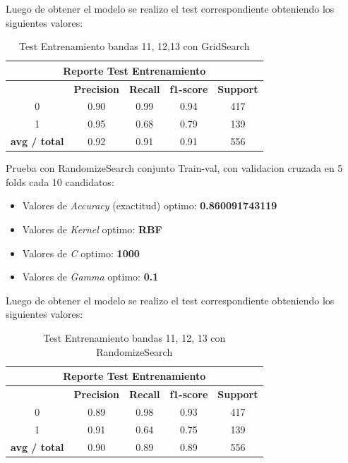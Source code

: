 Luego de obtener el modelo se realizo el test correspondiente obteniendo los siguientes valores:
\begin{table}[H]
\begin{center}
\begin{tabular}{|c|c|c|c|c|}
\hline \multicolumn{5}{|c|}{Reporte Test Entrenamiento} \\ \hline
\hline \textbf{} & \textbf{Precision} & \textbf{Recall} & \textbf{f1-score} & \textbf{Support}\\ \hline 
				 0   & 0.90 & 0.99 & 0.94  & 417	\\ \hline 
				 1   & 0.95 & 0.68 & 0.79  & 139 \\ \hline 
\textbf{avg / total} & 0.92 & 0.91 & 0.91  & 556 \\ \hline
\end{tabular}
\end{center} \caption{Test Entrenamiento bandas 11, 12,13 con GridSearch}\label{tab:gridsearchtest111213}
\end{table}


Prueba con RandomizeSearch conjunto Train-val, con validacion cruzada en 5 folds cada 10 candidatos:

\begin{itemize}
\item Valores de \textit{Accuracy} (exactitud) optimo: \textbf{0.860091743119}
\item Valores de \textit{Kernel} optimo: \textbf{RBF}
\item Valores de \textit{C} optimo: \textbf{1000} 	
\item Valores de \textit{Gamma} optimo: \textbf{0.1}

\end{itemize}

Luego de obtener el modelo se realizo el test correspondiente obteniendo los siguientes valores:
\begin{table}[H]
\begin{center}
\begin{tabular}{|c|c|c|c|c|}
\hline \multicolumn{5}{|c|}{Reporte Test Entrenamiento} \\ \hline
\hline \textbf{} & \textbf{Precision} & \textbf{Recall} & \textbf{f1-score} & \textbf{Support}\\ \hline 
				 0   & 0.89 & 0.98 & 0.93  & 417	\\ \hline 
				 1   & 0.91 & 0.64  & 0.75 & 139 \\ \hline 
\textbf{avg / total} & 0.90 & 0.89 & 0.89  & 556 \\ \hline
\end{tabular}
\end{center} \caption{Test Entrenamiento bandas 11, 12, 13 con RandomizeSearch}\label{tab:RandomTest111213}
\end{table}


